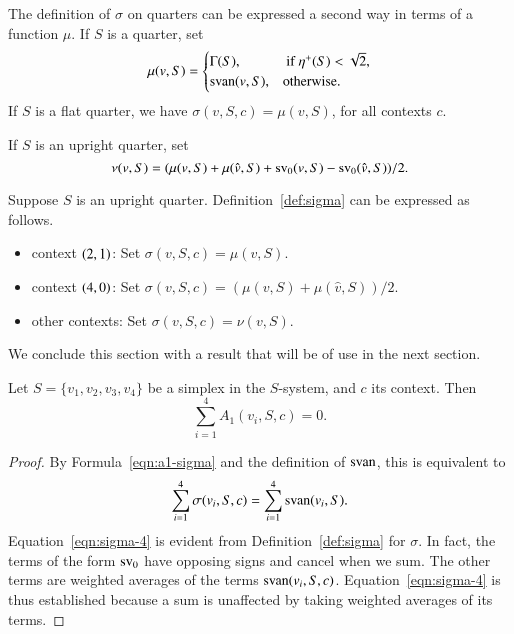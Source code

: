 The definition of $\sigma$ on quarters can be expressed a second
way in terms of a function $\mu$.  If $S$ is a quarter, set
    \begin{equation}
    \mu(v,S)=\begin{cases}
    \Gamma(S),&  \text{ if }\eta^+(S)<\sqrt2,\\
    {\operatorname{svan}}(v,S),& \hbox{otherwise.}\end{cases}
    \label{eqn:3.8}
    \end{equation}
If $S$ is a flat quarter, we have $\sigma(v,S,c)=\mu(v,S)$, for
all contexts $c$.

\begin{definition}[$\nu$] If $S$ is an upright quarter, set
$$\nu(v,S)=(\mu(v,S)+\mu(\hat v,S) + 
  {\operatorname{sv}}_0(v,S)-{\operatorname{sv}}_0(\hat v,S))/2.$$
\end{definition}


Suppose $S$ is an upright quarter.
Definition~\ref{def:sigma} can be expressed as follows.


\begin{itemize}
 \item context $\relax(2,1)$:  Set $\sigma(v,S,c)=\mu(v,S)$.
 \item context
    $\relax(4,0)$:  Set $\sigma(v,S,c)=(\mu(v,S)+\mu(\hat v,S))/2$.
 \item other contexts:
 Set $\sigma(v,S,c)=\nu(v,S)$.
\end{itemize}





We conclude this section with a result that will be of use in the
next section.

\begin{lemma}\label{lemma:A1-cancel}
Let $S=\{v_1,v_2,v_3,v_4\}$ be a simplex in the $S$-system,  and $c$
its context.   Then
   $$\sum_{i=1}^4 A_1(v_i,S,c)=0.$$
\end{lemma}

\begin{proof}
   By Formula~\ref{eqn:a1-sigma} and the definition of ${\operatorname{svan}}$,
this is equivalent to
      \begin{equation}
      \sum_{i=1}^4 \sigma(v_i,S,c) = \sum_{i=1}^4
      {\operatorname{svan}}(v_i,S). 
      \label{eqn:sigma-4}
      \end{equation}
Equation~\ref{eqn:sigma-4} is evident from
Definition~\ref{def:sigma} for $\sigma$.  In fact, the terms of the
form ${\operatorname{sv}}_0$ have opposing signs and cancel when we sum. The other
terms are weighted averages of the terms ${\operatorname{svan}}(v_i,S,c)$.
Equation~\ref{eqn:sigma-4} is thus established because a sum is
unaffected by taking weighted averages of its terms.
\end{proof}


